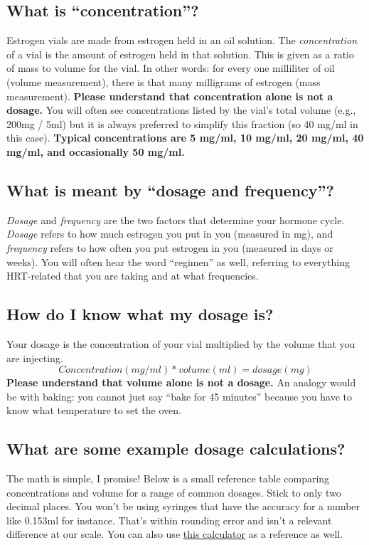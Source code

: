 \documentclass{article}
\begin{document}
\subsection{What is “concentration”?}

Estrogen vials are made from estrogen held in an oil solution. The \textit{concentration} of a vial is the amount of estrogen held in that solution. This is given as a ratio of mass to volume for the vial. In other words: for every one milliliter of oil (volume measurement), there is that many milligrams of estrogen (mass measurement). \textbf{Please understand that concentration alone is not a dosage.} You will often see concentrations listed by the vial’s total volume (e.g., 200mg / 5ml) but it is always preferred to simplify this fraction (so 40 mg/ml in this case). \textbf{Typical concentrations are 5 mg/ml, 10 mg/ml, 20 mg/ml, 40 mg/ml, and occasionally 50 mg/ml.}

\subsection{What is meant by “dosage and frequency”?}

\textit{Dosage} and \textit{frequency} are the two factors that determine your hormone cycle. \textit{Dosage} refers to how much estrogen you put in you (measured in mg), and \textit{frequency} refers to how often you put estrogen in you (measured in days or weeks). You will often hear the word “regimen” as well, referring to everything HRT-related that you are taking and at what frequencies.

\subsection{How do I know what my dosage is?}

Your dosage is the concentration of your vial multiplied by the volume that you are injecting. \[Concentration (mg/ml) * volume (ml) = dosage (mg)\] \textbf{Please understand that volume alone is not a dosage.} An analogy would be with baking: you cannot just say “bake for 45 minutes” because you have to know what temperature to set the oven.

\subsection{What are some example dosage calculations?}

The math is simple, I promise! Below is a small reference table comparing concentrations and volume for a range of common dosages. Stick to only two decimal places. You won’t be using syringes that have the accuracy for a number like 0.153ml for instance. That’s within rounding error and isn’t a relevant difference at our scale. You can also use \href{https://hrtcafe.net/Calc/}{this calculator} as a reference as well.
\end{document}
